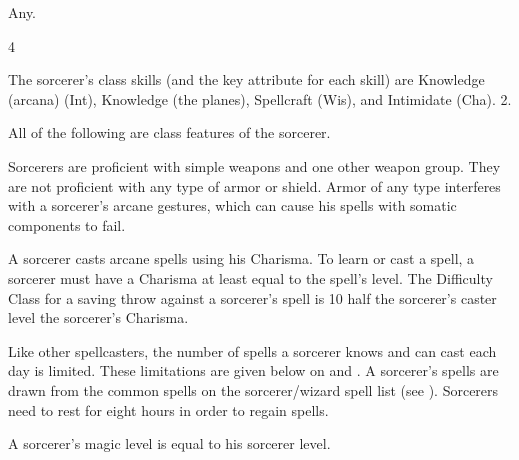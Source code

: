  Any.

 4

The sorcerer's class skills (and the key attribute for each skill) are Knowledge (arcana) (Int), Knowledge (the planes), Spellcraft (Wis), and Intimidate (Cha).
 2.

All of the following are class features of the sorcerer.

   Sorcerers are proficient with simple weapons  and one other weapon group.  They are not proficient with any type of armor or shield. Armor of any type interferes with a sorcerer's arcane gestures, which can cause his spells with somatic components to fail.

 A sorcerer casts arcane spells using his Charisma.  To learn or cast a spell, a sorcerer must have a Charisma at least equal to the spell's level. The Difficulty Class for a saving throw against a sorcerer's spell is 10 \add half the sorcerer's caster level \add the sorcerer's Charisma.

Like other spellcasters, the number of spells a sorcerer knows and can cast each day is limited. These limitations are given below on  and . A sorcerer's spells are drawn from the common spells on the sorcerer/wizard spell list (see ). Sorcerers need to rest for eight hours in order to regain spells.

A sorcerer's magic level is equal to his sorcerer level.


